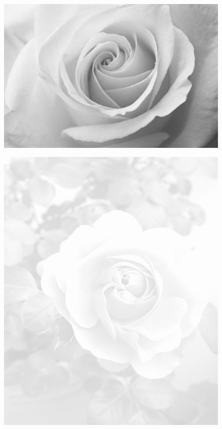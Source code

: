 \documentclass[ngerman,a4paper,11pt]{scrreprt}
\begin{document}
\begin{figure}[H]
\centering
\includegraphics[width=\textwidth,height=.8\textheight]{Bilder/Bilder/./750_0010_13971_Rose_im_Wald.png}
\end{figure}

\begin{figure}[H]
\centering
\includegraphics[width=\textwidth,height=.8\textheight]{Bilder/Bilder/./750_0010_14361_Hintergrund_Rose_2_Hell.png}
\end{figure}
\end{document}
